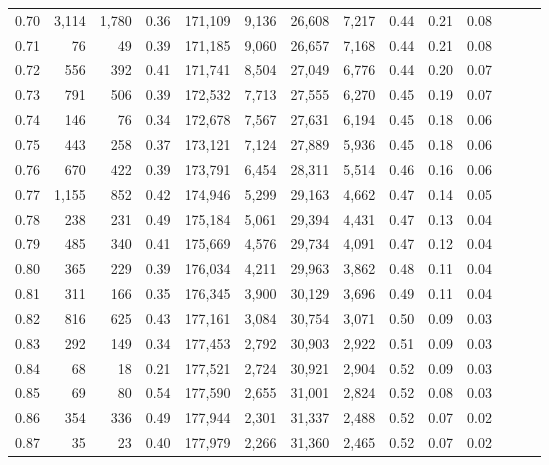 \begin{tabular}{rrrrrrrrrrrrrr}
0.70 &   3,114 &  1,780 &  0.36 &  171,109 &    9,136 &  26,608 &   7,217 &  0.44 &  0.21 &      0.08 \\
0.71 &      76 &     49 &  0.39 &  171,185 &    9,060 &  26,657 &   7,168 &  0.44 &  0.21 &      0.08 \\
0.72 &     556 &    392 &  0.41 &  171,741 &    8,504 &  27,049 &   6,776 &  0.44 &  0.20 &      0.07 \\
0.73 &     791 &    506 &  0.39 &  172,532 &    7,713 &  27,555 &   6,270 &  0.45 &  0.19 &      0.07 \\
0.74 &     146 &     76 &  0.34 &  172,678 &    7,567 &  27,631 &   6,194 &  0.45 &  0.18 &      0.06 \\
0.75 &     443 &    258 &  0.37 &  173,121 &    7,124 &  27,889 &   5,936 &  0.45 &  0.18 &      0.06 \\
0.76 &     670 &    422 &  0.39 &  173,791 &    6,454 &  28,311 &   5,514 &  0.46 &  0.16 &      0.06 \\
0.77 &   1,155 &    852 &  0.42 &  174,946 &    5,299 &  29,163 &   4,662 &  0.47 &  0.14 &      0.05 \\
0.78 &     238 &    231 &  0.49 &  175,184 &    5,061 &  29,394 &   4,431 &  0.47 &  0.13 &      0.04 \\
0.79 &     485 &    340 &  0.41 &  175,669 &    4,576 &  29,734 &   4,091 &  0.47 &  0.12 &      0.04 \\
0.80 &     365 &    229 &  0.39 &  176,034 &    4,211 &  29,963 &   3,862 &  0.48 &  0.11 &      0.04 \\
0.81 &     311 &    166 &  0.35 &  176,345 &    3,900 &  30,129 &   3,696 &  0.49 &  0.11 &      0.04 \\
0.82 &     816 &    625 &  0.43 &  177,161 &    3,084 &  30,754 &   3,071 &  0.50 &  0.09 &      0.03 \\
0.83 &     292 &    149 &  0.34 &  177,453 &    2,792 &  30,903 &   2,922 &  0.51 &  0.09 &      0.03 \\
0.84 &      68 &     18 &  0.21 &  177,521 &    2,724 &  30,921 &   2,904 &  0.52 &  0.09 &      0.03 \\
0.85 &      69 &     80 &  0.54 &  177,590 &    2,655 &  31,001 &   2,824 &  0.52 &  0.08 &      0.03 \\
0.86 &     354 &    336 &  0.49 &  177,944 &    2,301 &  31,337 &   2,488 &  0.52 &  0.07 &      0.02 \\
0.87 &      35 &     23 &  0.40 &  177,979 &    2,266 &  31,360 &   2,465 &  0.52 &  0.07 &      0.02 \\

\end{tabular}
